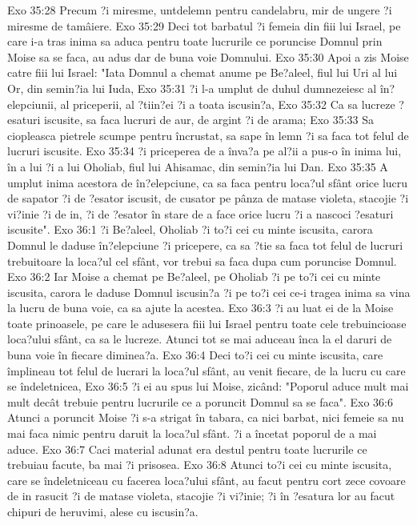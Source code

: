 Exo 35:28  Precum ?i miresme, untdelemn pentru candelabru, mir de ungere ?i miresme de tamâiere.
Exo 35:29  Deci tot barbatul ?i femeia din fiii lui Israel, pe care i-a tras inima sa aduca pentru toate lucrurile ce poruncise Domnul prin Moise sa se faca, au adus dar de buna voie Domnului.
Exo 35:30  Apoi a zis Moise catre fiii lui Israel: "Iata Domnul a chemat anume pe Be?aleel, fiul lui Uri al lui Or, din semin?ia lui Iuda,
Exo 35:31  ?i l-a umplut de duhul dumnezeiesc al în?elepciunii, al priceperii, al ?tiin?ei ?i a toata iscusin?a,
Exo 35:32  Ca sa lucreze ?esaturi iscusite, sa faca lucruri de aur, de argint ?i de arama;
Exo 35:33  Sa ciopleasca pietrele scumpe pentru încrustat, sa sape în lemn ?i sa faca tot felul de lucruri iscusite.
Exo 35:34  ?i priceperea de a înva?a pe al?ii a pus-o în inima lui, în a lui ?i a lui Oholiab, fiul lui Ahisamac, din semin?ia lui Dan.
Exo 35:35  A umplut inima acestora de în?elepciune, ca sa faca pentru loca?ul sfânt orice lucru de sapator ?i de ?esator iscusit, de cusator pe pânza de matase violeta, stacojie ?i vi?inie ?i de in, ?i de ?esator în stare de a face orice lucru ?i a nascoci ?esaturi iscusite".
Exo 36:1  ?i Be?aleel, Oholiab ?i to?i cei cu minte iscusita, carora Domnul le daduse în?elepciune ?i pricepere, ca sa ?tie sa faca tot felul de lucruri trebuitoare la loca?ul cel sfânt, vor trebui sa faca dupa cum poruncise Domnul.
Exo 36:2  Iar Moise a chemat pe Be?aleel, pe Oholiab ?i pe to?i cei cu minte iscusita, carora le daduse Domnul iscusin?a ?i pe to?i cei ce-i tragea inima sa vina la lucru de buna voie, ca sa ajute la acestea.
Exo 36:3  ?i au luat ei de la Moise toate prinoasele, pe care le adusesera fiii lui Israel pentru toate cele trebuincioase loca?ului sfânt, ca sa le lucreze. Atunci tot se mai aduceau înca la el daruri de buna voie în fiecare diminea?a.
Exo 36:4  Deci to?i cei cu minte iscusita, care împlineau tot felul de lucrari la loca?ul sfânt, au venit fiecare, de la lucru cu care se îndeletnicea,
Exo 36:5  ?i ei au spus lui Moise, zicând: "Poporul aduce mult mai mult decât trebuie pentru lucrurile ce a poruncit Domnul sa se faca".
Exo 36:6  Atunci a poruncit Moise ?i s-a strigat în tabara, ca nici barbat, nici femeie sa nu mai faca nimic pentru daruit la loca?ul sfânt. ?i a încetat poporul de a mai aduce.
Exo 36:7  Caci material adunat era destul pentru toate lucrurile ce trebuiau facute, ba mai ?i prisosea.
Exo 36:8  Atunci to?i cei cu minte iscusita, care se îndeletniceau cu facerea loca?ului sfânt, au facut pentru cort zece covoare de in rasucit ?i de matase violeta, stacojie ?i vi?inie; ?i în ?esatura lor au facut chipuri de heruvimi, alese cu iscusin?a.
